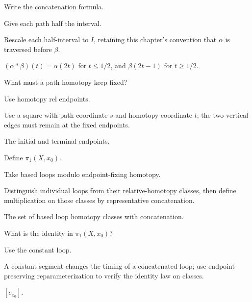 \begin{exercise}\label{exr:viii09-05}
Write the concatenation formula.
\end{exercise}
\begin{hint}
Give each path half the interval.

Rescale each half-interval to \(I\), retaining this chapter's convention that \(\alpha\) is traversed before \(\beta\).
\end{hint}
\begin{solution}
\((\alpha*\beta)(t)=\alpha(2t)\) for \(t\le1/2\), and \(\beta(2t-1)\) for \(t\ge1/2\).
\end{solution}

\begin{exercise}\label{exr:viii09-06}
What must a path homotopy keep fixed?
\end{exercise}
\begin{hint}
Use homotopy rel endpoints.

Use a square with path coordinate \(s\) and homotopy coordinate \(t\); the two vertical edges must remain at the fixed endpoints.
\end{hint}
\begin{solution}
The initial and terminal endpoints.
\end{solution}

\begin{exercise}\label{exr:viii09-07}
Define \(\pi_1(X,x_0)\).
\end{exercise}
\begin{hint}
Take based loops modulo endpoint-fixing homotopy.

Distinguish individual loops from their relative-homotopy classes, then define multiplication on those classes by representative concatenation.
\end{hint}
\begin{solution}
The set of based loop homotopy classes with concatenation.
\end{solution}

\begin{exercise}\label{exr:viii09-08}
What is the identity in \(\pi_1(X,x_0)\)?
\end{exercise}
\begin{hint}
Use the constant loop.

A constant segment changes the timing of a concatenated loop; use endpoint-preserving reparameterization to verify the identity law on classes.
\end{hint}
\begin{solution}
\([c_{x_0}]\).
\end{solution}

